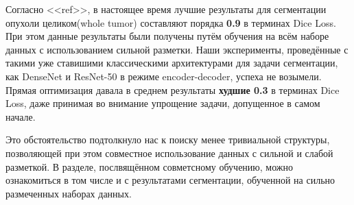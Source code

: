 Согласно <<ref>>, в настоящее время лучшие результаты для сегментации опухоли целиком(whole tumor) составляют порядка {\bf 0.9} в терминах Dice Loss. При этом данные результаты были получены путём обучения на всём наборе данных с использованием сильной разметки. Наши эксперименты, проведённые с такими уже ставишими классическими архитектурами для задачи сегментации, как DenseNet и ResNet-50 в режиме encoder-decoder, успеха не возымели. Прямая оптимизация давала в среднем результаты {\bf худшие 0.3} в терминах Dice Loss, даже принимая во внимание упрощение задачи, допущенное в самом начале. 

Это обстоятельство подтолкнуло нас к поиску менее тривиальной структуры, позволяющей при этом совместное использование данных с сильной и слабой разметкой. В разделе, послвящённом совметсному обучению, можно ознакомиться в том числе и с результатами сегментации,  обученной на сильно размеченных наборах данных.




